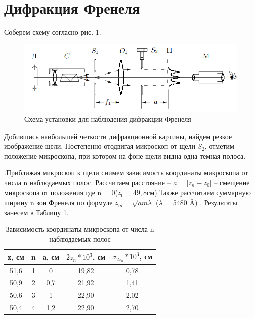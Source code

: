 \documentclass[a4paper,12pt]{article}
\begin{document}
\section*{Дифракция Френеля}

Соберем схему согласно рис. 1. 

\begin{figure}[h!]
	\begin{center}
    		\includegraphics[scale = 1]{fig1}
    		\caption{Схема установки для наблюдения дифракции Френеля}
	\end{center}
\end{figure}

Добившись наибольшей четкости дифракционной картины, найдем резкое изображение щели. Постепенно отодвигая микроскоп от щели $S_2$, отметим положение микроскопа, при котором на фоне щели видна одна темная полоса.

.Приближая микроскоп к щели снимем зависимость координаты микроскопа от числа n наблюдаемых полос. Рассчитаем расстояние -- $a = |z_n - z_0|$ -- смещение микроскопа от положения где n = 0($z_0 = 49,8 см $).Также рассчитаем суммарную ширину n зон Френеля по формуле $z_m = \sqrt{a m \lambda}$ ($\lambda$ = 5480 \AA) . Результаты занесем в Таблицу 1.

\newpage

\begin{table}[h]
\begin{center}
\caption{Зависимость координаты микроскопа от числа n наблюдаемых полос}
\begin{tabular}{|c|c|c|c|c|}
\hline
z, см & n & a, см & $2z_n * 10^3$, см & $\sigma_{2z_n} * 10^3$, см \\ \hline
51,6  & 1 & 0     & 19,82 & 0,78 \\ \hline
50,9  & 2 & 0,7   & 21,92 & 1,41\\ \hline
50,6  & 3 & 1     & 22,90 & 2,02\\ \hline
50,4  & 4 & 1,2   & 22,90 & 2,70\\ \hline
\end{tabular}
\end{center}
\end{table}
\end{document}
